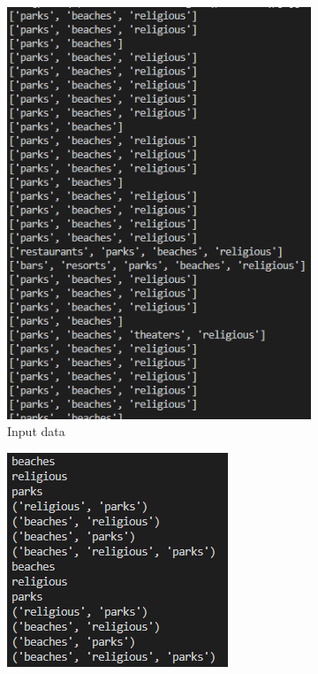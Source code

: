 \documentclass[a4paper]{article}
\begin{document}
\begin{figure}[h]
		\begin{subfigure}[b]{0.24\textwidth}
			\centering
			\includegraphics[width=\textwidth]{Baskets.PNG}
         	\caption{Input data}
         	\label{fig:input_data}
		\end{subfigure}
		\hfill
		\begin{subfigure}[b]{0.24\textwidth}
			\centering
			\includegraphics[width=\textwidth]{Batch_fi.PNG}

\end{subfigure}
\end{figure}
\end{document}
